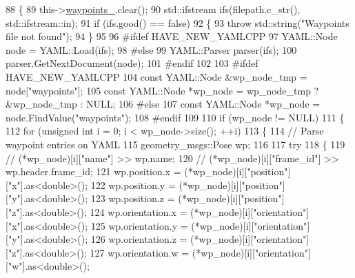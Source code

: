 \begin{DoxyCode}
88 \{
89   this->\hyperlink{classsmacc_1_1WaypointNavigator_a59d691f2177430c407b8e27df07552e9}{waypoints\_}.clear();
90   std::ifstream ifs(filepath.c\_str(), std::ifstream::in);
91   \textcolor{keywordflow}{if} (ifs.good() == \textcolor{keyword}{false})
92   \{
93     \textcolor{keywordflow}{throw} std::string(\textcolor{stringliteral}{"Waypoints file not found"});
94   \}
95 
96 \textcolor{preprocessor}{#ifdef HAVE\_NEW\_YAMLCPP}
97   YAML::Node node = YAML::Load(ifs);
98 \textcolor{preprocessor}{#else}
99   YAML::Parser parser(ifs);
100   parser.GetNextDocument(node);
101 \textcolor{preprocessor}{#endif}
102 
103 \textcolor{preprocessor}{#ifdef HAVE\_NEW\_YAMLCPP}
104   \textcolor{keyword}{const} YAML::Node &wp\_node\_tmp = node[\textcolor{stringliteral}{"waypoints"}];
105   \textcolor{keyword}{const} YAML::Node *wp\_node = wp\_node\_tmp ? &wp\_node\_tmp : NULL;
106 \textcolor{preprocessor}{#else}
107   \textcolor{keyword}{const} YAML::Node *wp\_node = node.FindValue(\textcolor{stringliteral}{"waypoints"});
108 \textcolor{preprocessor}{#endif}
109 
110   \textcolor{keywordflow}{if} (wp\_node != NULL)
111   \{
112     \textcolor{keywordflow}{for} (\textcolor{keywordtype}{unsigned} \textcolor{keywordtype}{int} i = 0; i < wp\_node->size(); ++i)
113     \{
114       \textcolor{comment}{// Parse waypoint entries on YAML}
115       geometry\_msgs::Pose wp;
116 
117       \textcolor{keywordflow}{try}
118       \{
119         \textcolor{comment}{// (*wp\_node)[i]["name"] >> wp.name;}
120         \textcolor{comment}{// (*wp\_node)[i]["frame\_id"] >> wp.header.frame\_id;}
121         wp.position.x = (*wp\_node)[i][\textcolor{stringliteral}{"position"}][\textcolor{stringliteral}{"x"}].as<\textcolor{keywordtype}{double}>();
122         wp.position.y = (*wp\_node)[i][\textcolor{stringliteral}{"position"}][\textcolor{stringliteral}{"y"}].as<\textcolor{keywordtype}{double}>();
123         wp.position.z = (*wp\_node)[i][\textcolor{stringliteral}{"position"}][\textcolor{stringliteral}{"z"}].as<\textcolor{keywordtype}{double}>();
124         wp.orientation.x = (*wp\_node)[i][\textcolor{stringliteral}{"orientation"}][\textcolor{stringliteral}{"x"}].as<\textcolor{keywordtype}{double}>();
125         wp.orientation.y = (*wp\_node)[i][\textcolor{stringliteral}{"orientation"}][\textcolor{stringliteral}{"y"}].as<\textcolor{keywordtype}{double}>();
126         wp.orientation.z = (*wp\_node)[i][\textcolor{stringliteral}{"orientation"}][\textcolor{stringliteral}{"z"}].as<\textcolor{keywordtype}{double}>();
127         wp.orientation.w = (*wp\_node)[i][\textcolor{stringliteral}{"orientation"}][\textcolor{stringliteral}{"w"}].as<\textcolor{keywordtype}{double}>();

\end{DoxyCode}
